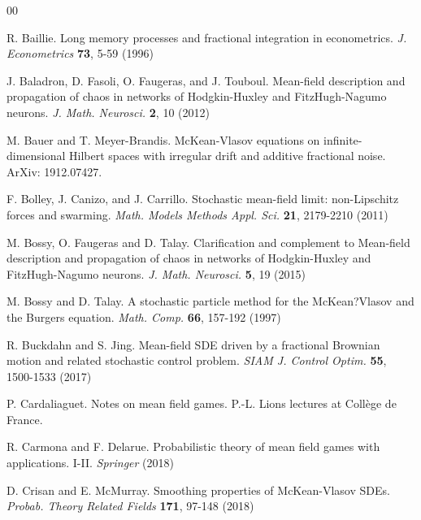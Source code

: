 \documentclass[12pt]{article}
\numberwithin{equation}{section}
\begin{document}
\begin{thebibliography}{00}
	
	 R. Baillie. Long memory processes and fractional integration in econometrics. {\it J. Econometrics} {\bf 73}, 5-59 (1996)
	
	J. Baladron, D. Fasoli, O. Faugeras, and J. Touboul. Mean-field description and propagation of chaos in networks of Hodgkin-Huxley and FitzHugh-Nagumo neurons. {\it J. Math. Neurosci.} {\bf 2}, 10 (2012)
	
	M. Bauer and T. Meyer-Brandis. McKean-Vlasov equations on infinite-dimensional Hilbert spaces with irregular drift and additive fractional noise. ArXiv: 1912.07427.
	
	
	
	F. Bolley, J. Canizo, and J. Carrillo. Stochastic mean-field limit: non-Lipschitz forces and swarming. {\it Math. Models Methods Appl. Sci.} {\bf 21}, 2179-2210 (2011)
	
	M. Bossy, O. Faugeras and D. Talay. Clarification and complement to Mean-field description and propagation of chaos
	in networks of Hodgkin-Huxley and FitzHugh-Nagumo neurons. {\it J. Math. Neurosci.} {\bf 5}, 19 (2015)
	
	 M. Bossy and D. Talay. A stochastic particle method for the McKean?Vlasov and the Burgers equation. {\it Math. Comp.} {\bf 66}, 157-192 (1997)
	
	
	 R. Buckdahn and S. Jing. Mean-field SDE driven by a fractional Brownian motion and   related stochastic control problem. {\it SIAM J. Control Optim.} {\bf 55}, 1500-1533 (2017)
	
	 P. Cardaliaguet. Notes on mean field games. P.-L. Lions lectures at Coll\`{e}ge de France.
	
	 R. Carmona and F. Delarue. Probabilistic theory of mean field games with applications. I-II.  {\it Springer} (2018)
	
	 D. Crisan and E. McMurray. Smoothing properties of McKean-Vlasov SDEs. {\it Probab. Theory Related Fields} {\bf 171}, 97-148 (2018)
	

\end{thebibliography}
\end{document}
